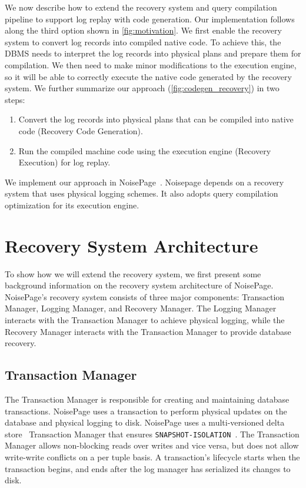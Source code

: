 \documentclass[12pt]{cmuthesis}
\begin{document}
We now describe how to extend the recovery system and query compilation pipeline to support log replay with code generation. Our implementation follows along the third option shown in \cref{fig:motivation}. We first enable the recovery system to convert log records into compiled native code. To achieve this, the DBMS needs to interpret the log records into physical plans and prepare them for compilation. We then need to make minor modifications to the execution engine, so it will be able to correctly execute the native code generated by the recovery system. We further summarize our approach (\cref{fig:codegen_recovery}) in two steps:

\begin{enumerate}
\item Convert the log records into physical plans that can be compiled into native code (Recovery Code Generation).
\item Run the compiled machine code using the execution engine (Recovery Execution) for log replay.
\end{enumerate}
We implement our approach in NoisePage~\cite{noisepage}. Noisepage depends on a recovery system that uses physical logging schemes. It also adopts query compilation optimization for its execution engine.

\section{Recovery System Architecture}
 To show how we will extend the recovery system, we first present some background information on the recovery system architecture of NoisePage. NoisePage's recovery system consists of three major components: Transaction Manager, Logging Manager, and Recovery Manager. The Logging Manager interacts with the Transaction Manager to achieve physical logging, while the Recovery Manager interacts with the Transaction Manager to provide database recovery. 

\subsection{Transaction Manager}
The Transaction Manager is responsible for creating and maintaining database transactions. NoisePage uses a transaction to perform physical updates on the database and physical logging to disk. NoisePage uses a multi-versioned delta store~\cite{reed78} Transaction Manager that ensures \texttt{SNAPSHOT-ISOLATION}~\cite{berenson95}. The Transaction Manager allows non-blocking reads over writes and vice versa, but does not allow write-write conflicts on a per tuple basis. A transaction's lifecycle starts when the transaction begins, and ends after the log manager has serialized its changes to disk.
\end{document}

